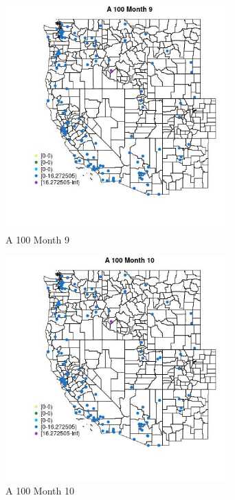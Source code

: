 \begin{figure} 
\centering  
\includegraphics[width=0.77\textwidth]{Code_Outputs/Report_ML_input_PM25_Step4_part_e_de_duplicated_aves_MapObsMo9A_100.jpg} 
\caption{\label{fig:Report_ML_input_PM25_Step4_part_e_de_duplicated_avesMapObsMo9A_100}A 100 Month 9} 
\end{figure} 
 

\begin{figure} 
\centering  
\includegraphics[width=0.77\textwidth]{Code_Outputs/Report_ML_input_PM25_Step4_part_e_de_duplicated_aves_MapObsMo10A_100.jpg} 
\caption{\label{fig:Report_ML_input_PM25_Step4_part_e_de_duplicated_avesMapObsMo10A_100}A 100 Month 10} 
\end{figure} 
 

